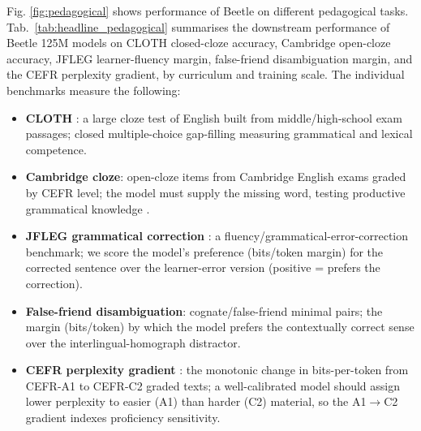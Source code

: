\documentclass[11pt]{article}
\newcommand{\beetle}{Beetle} %
\begin{document}
Fig. \ref{fig:pedagogical} shows performance of \beetle{} on different pedagogical tasks. Tab.~\ref{tab:headline_pedagogical} summarises the downstream performance of \beetle{} 125M models on CLOTH closed-cloze accuracy, Cambridge open-cloze accuracy, JFLEG learner-fluency margin, false-friend disambiguation margin, and the CEFR perplexity gradient, by curriculum and training scale. The individual benchmarks measure the following:
\begin{itemize}
  \item \textbf{CLOTH} \citep{xie-etal-2018-cloth}: a large cloze test of English built from middle/high-school exam passages; closed multiple-choice gap-filling measuring grammatical and lexical competence.
  \item \textbf{Cambridge cloze}: open-cloze items from Cambridge English exams graded by CEFR level; the model must supply the missing word, testing productive grammatical knowledge \citep{mullooly2023cupa5}.
  \item \textbf{JFLEG grammatical correction} \citep{napoles-etal-2017-jfleg}: a fluency/grammatical-error-correction benchmark; we score the model's preference (bits/token margin) for the corrected sentence over the learner-error version (positive = prefers the correction).
  \item \textbf{False-friend disambiguation}: cognate/false-friend minimal pairs; the margin (bits/token) by which the model prefers the contextually correct sense over the interlingual-homograph distractor.
  \item \textbf{CEFR perplexity gradient} \citep{arase-etal-2022-cefr}: the monotonic change in bits-per-token from CEFR-A1 to CEFR-C2 graded texts; a well-calibrated model should assign lower perplexity to easier (A1) than harder (C2) material, so the A1$\to$C2 gradient indexes proficiency sensitivity.
\end{itemize}

\clearpage 
\end{document}

